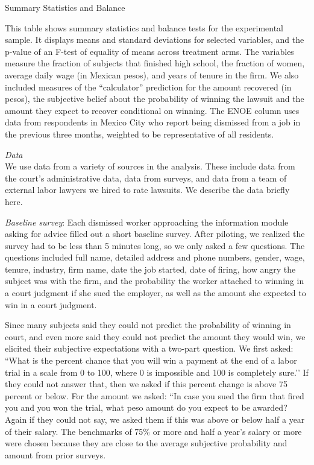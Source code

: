 \documentclass[oneside,12pt]{article}
\begin{document}
\begin{table}[!ht]
    \caption{Summary Statistics and Balance}
    \label{tab:SS}
    \center
    \scriptsize{}
    
    \begin{figurenotes}
    This table shows summary statistics and balance tests for the experimental sample. It displays means and standard deviations for selected variables, and the p-value of an F-test of equality of means across treatment arms. The variables measure the fraction of subjects that finished high school, the fraction of women, average daily wage (in Mexican pesos), and years of tenure in the firm. We also included measures of the “calculator” prediction for the amount recovered (in pesos), the subjective belief about the probability of winning the lawsuit and the amount they expect to recover conditional on winning. The ENOE column uses data from respondents in Mexico City who report being dismissed from a job in the previous three months, weighted to be representative of all residents.
    \end{figurenotes}
  
\end{table}


\[\]
\emph{Data}\\
We use data from a variety of sources in the analysis. These include data from the court’s administrative data, data from surveys, and data from a team of external labor lawyers we hired to rate lawsuits. We describe the data briefly here. 

\emph{Baseline survey}: Each dismissed worker approaching the information module asking for advice filled out a short baseline survey. After piloting, we realized the survey had to be less than 5 minutes long, so we only asked a few questions. The questions included full name, detailed address and phone numbers, gender, wage, tenure, industry, firm name, date the job started, date of firing, how angry the subject was with the firm, and the probability the worker attached to winning in a court judgment if she sued the employer, as well as the amount she expected to win in a court judgment. 

Since many subjects said they could not predict the probability of winning in court, and even more said they could not predict the amount they would win, we elicited their subjective expectations with a two-part question. We first asked: “What is the percent chance that you will win a payment at the end of a labor trial in a scale from 0 to 100, where 0 is impossible and 100 is completely sure.’’ If they could not answer that, then we asked if this percent change is above 75 percent or below. For the amount we asked: “In case you sued the firm that fired you and you won the trial, what peso amount do you expect to be awarded? Again if they could not say, we asked them if this was above or below half a year of their salary. The benchmarks of 75\% or more and half a year’s salary or more were chosen because they are close to the average subjective probability and amount from prior surveys. 
\end{document}
